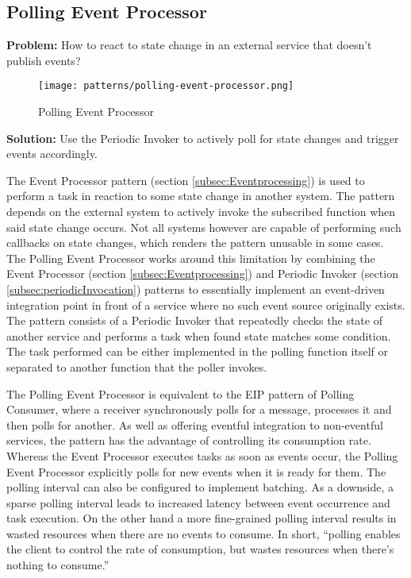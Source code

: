 \subsection{Polling Event Processor} \label{subsec:PollingEventProcessor}

\textbf{Problem:} How to react to state change in an external service that doesn't publish events?

\begin{figure}[h]
  \centering
  \texttt{[image: patterns/polling-event-processor.png]}
  \caption{Polling Event Processor}
  \label{fig:PollingEventProcessor}
\end{figure}

\textbf{Solution:} Use the Periodic Invoker to actively poll for state changes and trigger events accordingly.

The Event Processor pattern (section \ref{subsec:Eventprocessing}) is used to perform a task in reaction to some state change in another system. The pattern depends on the external system to actively invoke the subscribed function when said state change occurs. Not all systems however are capable of performing such callbacks on state changes, which renders the pattern unusable in some cases. The Polling Event Processor works around this limitation by combining the Event Processor (section \ref{subsec:Eventprocessing}) and Periodic Invoker (section \ref{subsec:periodicInvocation}) patterns to essentially implement an event-driven integration point in front of a service where no such event source originally exists. The pattern consists of a Periodic Invoker that repeatedly checks the state of another service and performs a task when found state matches some condition. The task performed can be either implemented in the polling function itself or separated to another function that the poller invokes.

The Polling Event Processor is equivalent to the EIP pattern of Polling Consumer, where a receiver synchronously polls for a message, processes it and then polls for another. As well as offering eventful integration to non-eventful services, the pattern has the advantage of controlling its consumption rate. Whereas the Event Processor executes tasks as soon as events occur, the Polling Event Processor explicitly polls for new events when it is ready for them. The polling interval can also be configured to implement batching. As a downside, a sparse polling interval leads to increased latency between event occurrence and task execution. On the other hand a more fine-grained polling interval results in wasted resources when there are no events to consume. In short, ``polling enables the client to control the rate of consumption, but wastes resources when there’s nothing to consume.'' \parencite{hohpe2004enterprise}

